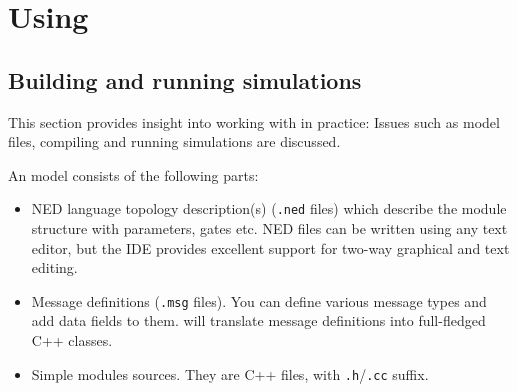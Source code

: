 %
%
%
%
%
%


\section{Using {\opp}}


\subsection{Building and running simulations}

This section provides insight into working with {\opp} in practice:
Issues such as model files, compiling and running simulations are
discussed.

An {\opp} model consists of the following parts:
\begin{itemize}
  \item{NED language topology description(s) (\texttt{.ned} files)
    which describe the module structure with parameters, gates etc.
    NED files can be written using any text editor, but the {\opp} IDE
    provides excellent support for two-way graphical and text editing.}
  \item{Message definitions (\texttt{.msg} files). You can define various message
    types and add data fields to them. {\opp} will translate message definitions
    into full-fledged C++ classes.}
  \item{Simple modules sources. They are C++ files, with \texttt{.h}/\texttt{.cc} suffix.}
\end{itemize}

